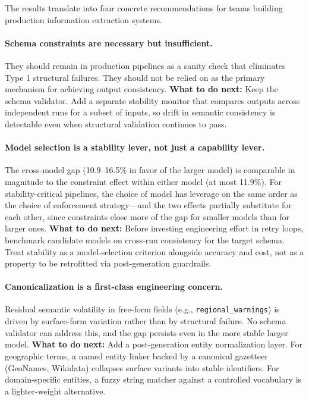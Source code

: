 \documentclass[sigconf]{acmart}
\begin{document}
The results translate into four concrete recommendations for teams building production information extraction systems.

\paragraph{Schema constraints are necessary but insufficient.}
They should remain in production pipelines as a sanity check that eliminates Type 1 structural failures. They should not be relied on as the primary mechanism for achieving output consistency.
\textbf{What to do next:} Keep the schema validator. Add a separate stability monitor that compares outputs across independent runs for a subset of inputs, so drift in semantic consistency is detectable even when structural validation continues to pass.

\paragraph{Model selection is a stability lever, not just a capability lever.}
The cross-model gap (10.9--16.5\% in favor of the larger model) is comparable in magnitude to the constraint effect within either model (at most 11.9\%). For stability-critical pipelines, the choice of model has leverage on the same order as the choice of enforcement strategy---and the two effects partially substitute for each other, since constraints close more of the gap for smaller models than for larger ones.
\textbf{What to do next:} Before investing engineering effort in retry loops, benchmark candidate models on cross-run consistency for the target schema. Treat stability as a model-selection criterion alongside accuracy and cost, not as a property to be retrofitted via post-generation guardrails.

\paragraph{Canonicalization is a first-class engineering concern.}
Residual semantic volatility in free-form fields (e.g., \texttt{regional\_warnings}) is driven by surface-form variation rather than by structural failure. No schema validator can address this, and the gap persists even in the more stable larger model.
\textbf{What to do next:} Add a post-generation entity normalization layer. For geographic terms, a named entity linker backed by a canonical gazetteer (GeoNames, Wikidata) collapses surface variants into stable identifiers. For domain-specific entities, a fuzzy string matcher against a controlled vocabulary is a lighter-weight alternative.
\end{document}
